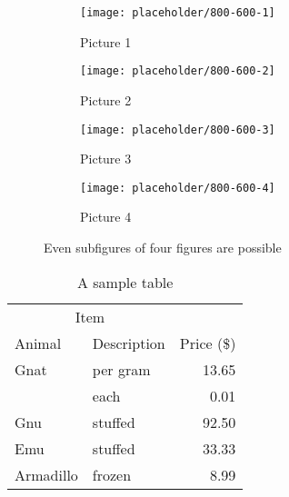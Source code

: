 \documentclass[%
    thesis=ma, %
    language=american, %
    paper=a4,%
    listings,
    online,
    final,
]{isw}
\begin{document}
    \begin{figure}
        \centering
        \begin{subfigure}[b]{0.49\textwidth}
            \texttt{[image: placeholder/800-600-1]}
            \caption{Picture 1}
            \label{fig:subfigures-four:1}
        \end{subfigure}
        \hfill
        \begin{subfigure}[b]{0.49\textwidth}
            \texttt{[image: placeholder/800-600-2]}
            \caption{Picture 2}
            \label{fig:subfigures-four:2}
        \end{subfigure}
        \hfill
        \begin{subfigure}[b]{0.49\textwidth}
            \texttt{[image: placeholder/800-600-3]}
            \caption{Picture 3}
            \label{fig:subfigures-four:3}
        \end{subfigure}
        \hfill
        \begin{subfigure}[b]{0.49\textwidth}
            \texttt{[image: placeholder/800-600-4]}
            \caption{Picture 4}
            \label{fig:subfigures-four:4}
        \end{subfigure}
        
        \caption{Even subfigures of four figures are possible}
        \label{fig:subfigures-2}
    \end{figure}
    
    \begin{table}
        \centering
        \caption{A sample table}
        \label{tbl:sample-table}
        \begin{tabular}{@{}llr@{}} \toprule
            \multicolumn{2}{c}{Item} \\ \cmidrule(r){1-2}
            Animal & Description & Price (\$)\\ \midrule
            Gnat  & per gram  & 13.65 \\
            & each      & 0.01 \\
            Gnu   & stuffed   & 92.50 \\
            Emu   & stuffed   & 33.33 \\
            Armadillo & frozen & 8.99 \\ \bottomrule
        \end{tabular}
    \end{table}
    
\end{document}
